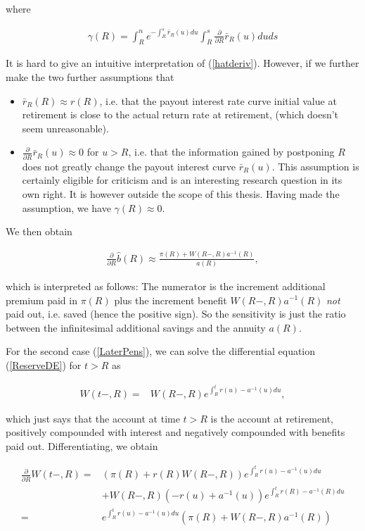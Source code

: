 \documentclass{book}
\newcommand{\1}[1]{\mathbbm{1}_{\left\lbrace #1 \right\rbrace}}
\theoremstyle{break}
\theoremstyle{remark}
\numberwithin{equation}{section}
\begin{document}
where

\begin{align*}
	\gamma(R) = \int_R^n e^{-\int_R^s \bar{r}_R(u) du} \int_R^s 	\frac{\partial}{\partial R} \bar{r}_R(u) du ds
\end{align*}

It is hard to give an intuitive interpretation of (\ref{hatderiv}). However, if we further make the two further assumptions that

\begin{itemize}
	\item $\bar{r}_R (R) \approx r (R)$, i.e. that the payout interest rate curve initial value at retirement is close to the actual return rate at retirement, (which doesn't seem unreasonable).
	\item $\frac{\partial}{\partial R} \bar{r}_R(u) \approx 0$ for $u > R$, i.e. that the information gained by postponing $R$ does not greatly change the payout interest curve $\bar{r}_R(u)$. This assumption is certainly eligible for criticism and is an interesting research question in its own right. It is however outside the scope of this thesis. Having made the assumption, we have $\gamma(R) \approx 0$.
\end{itemize}

We then obtain

\begin{align*}
	\frac{\partial}{\partial R} \hat{b}(R) \approx \frac{\pi(R) + W(R-,R) a^{-1}(R)}{a(R)},
\end{align*}

which is interpreted as follows: The numerator is the increment additional premium paid in $\pi(R)$ plus the increment benefit $W(R-,R) a^{-1}(R)$ \textit{not} paid out, i.e. saved (hence the positive sign). So the sensitivity is just the ratio between the  infinitesimal additional savings and the annuity $a(R)$.

For the second case (\ref{LaterPens}), we can solve the differential equation (\ref{ReserveDE}) for $t>R$ as

\begin{align} \label{ReserveAfterRetirement}
	W(t-,R) =& W(R-,R) e^{\int_R^t r(u) - a^{-1}(u) du},
\end{align}

which just says that the account at time $t>R$ is the account at retirement, positively compounded with interest and negatively compounded with benefits paid out. Differentiating, we obtain

\begin{align*}
	\frac{\partial}{\partial R} W(t-,R) =& \left( \pi(R) + r(R) W(R-,R) \right) e^{\int_R^t r(u) - a^{-1}(u) du} \\
	&+ W(R-,R) \left( - r(u) + a^{-1}(u) \right) e^{\int_R^t r(R) - a^{-1}(R) du} \\
	=& e^{\int_R^t r(u) - a^{-1}(u) du} \left( \pi (R) + W(R-,R) a^{-1}(R) \right)
\end{align*}
\end{document}

